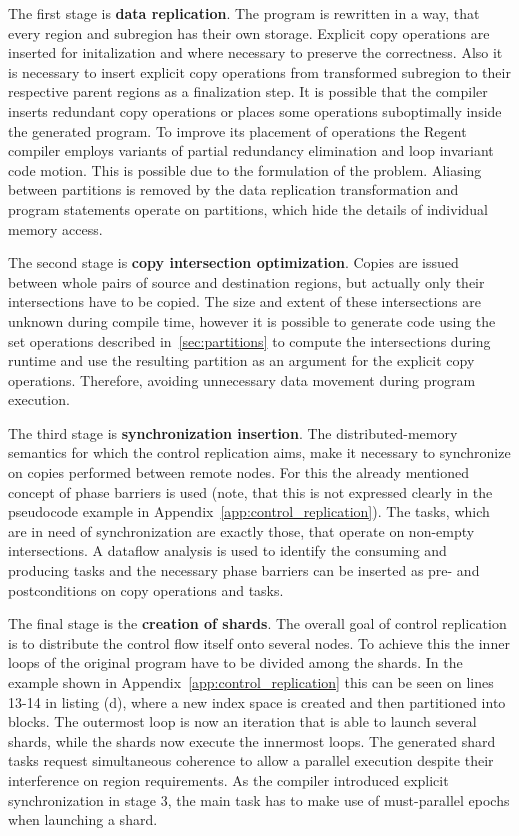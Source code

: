 \documentclass{article}      %
\begin{document}
The first stage is \textbf{data replication}. The program is rewritten in a way, that every region and subregion has their own storage. Explicit copy operations are inserted for initalization and where necessary to preserve the correctness. Also it is necessary to insert explicit copy operations from transformed subregion to their respective parent regions as a finalization step.
It is possible that the compiler inserts redundant copy operations or places some operations suboptimally inside the generated program. To improve its placement of operations the Regent compiler employs variants of partial redundancy elimination and loop invariant code motion. This is possible due to the formulation of the problem. Aliasing between partitions is removed by the data replication transformation and program statements operate on partitions, which hide the details of individual memory access.

The second stage is \textbf{copy intersection optimization}. Copies are issued between whole pairs of source and destination regions, but actually only their intersections have to be copied. The size and extent of these intersections are unknown during compile time, however it is possible to generate code using the set operations described in~\ref{sec:partitions} to compute the intersections during runtime and use the resulting partition as an argument for the explicit copy operations. Therefore, avoiding unnecessary data movement during program execution.

The third stage is \textbf{synchronization insertion}. The distributed-memory semantics for which the control replication aims, make it necessary to synchronize on copies performed between remote nodes. For this the already mentioned concept of phase barriers is used (note, that this is not expressed clearly in the pseudocode example in Appendix~\ref{app:control_replication}). The tasks, which are in need of synchronization are exactly those, that operate on non-empty intersections. A dataflow analysis is used to identify the consuming and producing tasks and the necessary phase barriers can be inserted as pre- and postconditions on copy operations and tasks.

The final stage is the \textbf{creation of shards}. The overall goal of control replication is to distribute the control flow itself onto several nodes. To achieve this the inner loops of the original program have to be divided among the shards. In the example shown in Appendix~\ref{app:control_replication} this can be seen on lines 13-14 in listing (d), where a new index space is created and then partitioned into blocks. The outermost loop is now an iteration that is able to launch several shards, while the shards now execute the innermost loops. The generated shard tasks request simultaneous coherence to allow a parallel execution despite their interference on region requirements. As the compiler introduced explicit synchronization in stage 3, the main task has to make use of must-parallel epochs when launching a shard.
\end{document}
